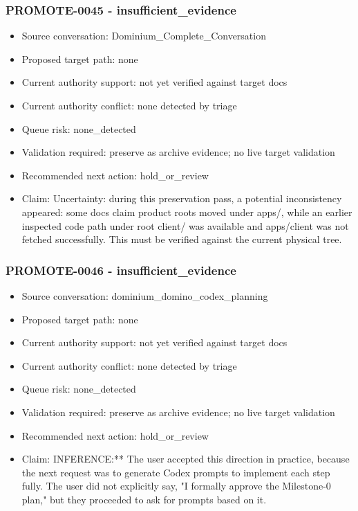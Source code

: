 \documentclass[11pt,a4paper]{report}
\begin{document}
\subsubsection{PROMOTE-0045 - insufficient\_evidence}

\begin{itemize}
\item Source conversation: Dominium\_Complete\_Conversation
\item Proposed target path: none
\item Current authority support: not yet verified against target docs
\item Current authority conflict: none detected by triage
\item Queue risk: none\_detected
\item Validation required: preserve as archive evidence; no live target validation
\item Recommended next action: hold\_or\_review
\item Claim: Uncertainty: during this preservation pass, a potential inconsistency appeared: some docs claim product roots moved under apps/, while an earlier inspected code path under root client/ was available and apps/client was not fetched successfully. This must be verified against the current physical tree.
\end{itemize}

\subsubsection{PROMOTE-0046 - insufficient\_evidence}

\begin{itemize}
\item Source conversation: dominium\_domino\_codex\_planning
\item Proposed target path: none
\item Current authority support: not yet verified against target docs
\item Current authority conflict: none detected by triage
\item Queue risk: none\_detected
\item Validation required: preserve as archive evidence; no live target validation
\item Recommended next action: hold\_or\_review
\item Claim: INFERENCE:** The user accepted this direction in practice, because the next request was to generate Codex prompts to implement each step fully. The user did not explicitly say, "I formally approve the Milestone-0 plan," but they proceeded to ask for prompts based on it.
\end{itemize}
\end{document}
